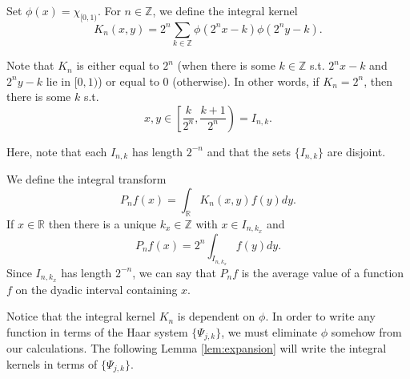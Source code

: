 \documentclass[11pt]{amsart}
\theoremstyle{theorem} %
\theoremstyle{definition}
\theoremstyle{example}
\theoremstyle{remark}
\numberwithin{equation}{section}
\newcommand{\R}{\mathbb{R}}
\newcommand{\Z}{\mathbb{Z}}
\begin{document}
\vspace{8pt}
Set $ \phi(x) = \chi_{[0,1)}$. For $ n \in \Z $, we define the integral kernel
\[ K_n (x,y) = 2^n \sum_{k \in \Z} \phi(2^n x - k) \phi(2^n y - k). \]

Note that $ K_n $ is either equal to $ 2^n $ (when there is some $ k \in \Z $ s.t. $ 2^n x-k $ and $ 2^ny - k $ lie in $ [0,1) $) or equal to 0 (otherwise). In other words, if $ K_n = 2^n $, then there is some $ k $ s.t.
\begin{equation} \label{eq:K}
	x,y \in \left[ \frac{k}{2^n}, \frac{k+1}{2^n} \right) = I_{n,k}.
\end{equation}

Here, note that each $ I_{n,k} $ has length $ 2^{-n} $ and that
the sets $ \{ I_{n,k} \} $ are disjoint.

We define the integral transform
\[ P_n f(x) = \int_{\R} K_n(x,y) f(y) dy. \]
If $ x \in \R $ then there is a unique $ k_x \in \Z $ with $ x \in I_{n, k_x} $ and
\begin{equation} \label{eq:pnf}
	P_n f(x) = 2^n \int_{I_{n,k_x}} f(y) dy.
\end{equation}
Since $ I_{n,k_x} $ has length $ 2^{-n} $, we can say that $ P_nf $ is the average value of a function $ f $ on the dyadic interval containing $ x $.

\vspace{8pt}
Notice that the integral kernel $ K_n $ is dependent on $ \phi $. In order to write any function in terms of the Haar system $ \{ \varPsi_{j,k} \} $, we must eliminate $ \phi $ somehow from our calculations. The following Lemma \ref{lem:expansion} will write the integral kernels in terms of $ \{ \varPsi_{j,k} \} $.
\end{document}
